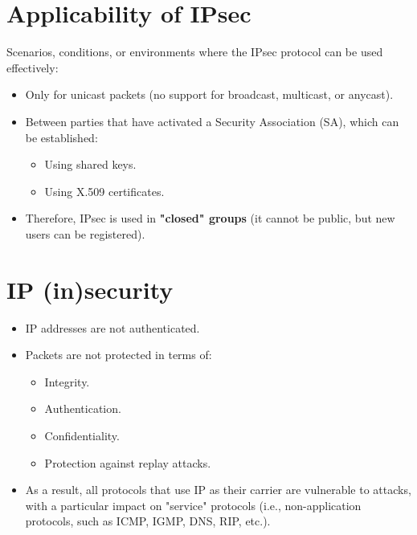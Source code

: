 \section{Applicability of IPsec}
Scenarios, conditions, or environments where the IPsec protocol can be used effectively:
\begin{itemize}
    \item Only for unicast packets (no support for broadcast, multicast, or anycast).
    \item Between parties that have activated a Security Association (SA), which can be established:
    \begin{itemize}
        \item Using shared keys.
        \item Using X.509 certificates.
    \end{itemize}
    \item Therefore, IPsec is used in \textbf{"closed" groups} (it cannot be public, but new users can be registered).
\end{itemize}

\section{IP (in)security}
\begin{itemize}
    \item IP addresses are not authenticated.
    \item Packets are not protected in terms of:
    \begin{itemize}
        \item Integrity.
        \item Authentication.
        \item Confidentiality.
        \item Protection against replay attacks.
    \end{itemize}
    \item As a result, all protocols that use IP as their carrier are vulnerable to attacks, with a particular impact on "service" protocols (i.e., non-application protocols, such as ICMP, IGMP, DNS, RIP, etc.).
\end{itemize}

